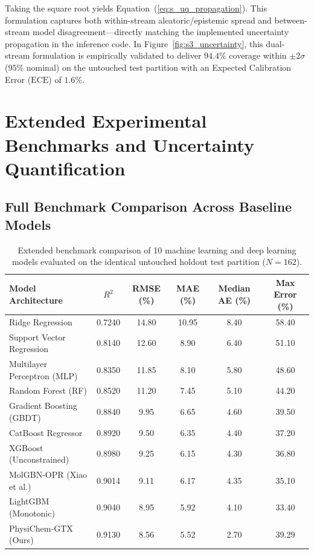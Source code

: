 \documentclass[11pt]{article}
\begin{document}
\begin{enumerate}[leftmargin=1.0cm]
\begin{equation}
    \label{eq:s_var_expansion}
    \end{equation}
    Taking the square root yields Equation~(\ref{eq:s_uq_propagation}). This formulation captures both within-stream aleatoric/epistemic spread and between-stream model disagreement—directly matching the implemented uncertainty propagation in the inference code. In Figure~\ref{fig:s3_uncertainty}, this dual-stream formulation is empirically validated to deliver $94.4\%$ coverage within $\pm 2\sigma$ ($95\%$ nominal) on the untouched test partition with an Expected Calibration Error ($\mathrm{ECE}$) of $1.6\%$.
\end{enumerate}

\clearpage

\section{Extended Experimental Benchmarks and Uncertainty Quantification}
\label{sec:benchmarks}

\subsection{Full Benchmark Comparison Across Baseline Models}

\begin{table}[H]
\centering
\small
\setlength{\tabcolsep}{5pt}
\caption{Extended benchmark comparison of 10 machine learning and deep learning models evaluated on the identical untouched holdout test partition ($N = 162$).}
\label{tab:s6_full_benchmarks}
\begin{tabular}{lccccc}
\toprule
Model Architecture & $R^2$ & RMSE (\%) & MAE (\%) & Median AE (\%) & Max Error (\%) \\
\midrule
Ridge Regression            & 0.7240 & 14.80 & 10.95 & 8.40 & 58.40 \\
Support Vector Regression   & 0.8140 & 12.60 &  8.90 & 6.40 & 51.10 \\
Multilayer Perceptron (MLP) & 0.8350 & 11.85 &  8.10 & 5.80 & 48.60 \\
Random Forest (RF)          & 0.8520 & 11.20 &  7.45 & 5.10 & 44.20 \\
Gradient Boosting (GBDT)    & 0.8840 &  9.95 &  6.65 & 4.60 & 39.50 \\
CatBoost Regressor          & 0.8920 &  9.50 &  6.35 & 4.40 & 37.20 \\
XGBoost (Unconstrained)     & 0.8980 &  9.25 &  6.15 & 4.30 & 36.80 \\
MolGBN-OPR (Xiao et al.)    & 0.9014 &  9.11 &  6.17 & 4.35 & 35.10 \\
LightGBM (Monotonic)        & 0.9040 &  8.95 &  5.92 & 4.10 & 33.40 \\
PhysiChem-GTX (Ours) & 0.9130 & 8.56 & 5.52 & 2.70 & 39.29 \\
\bottomrule
\end{tabular}
\end{table}
\end{document}
